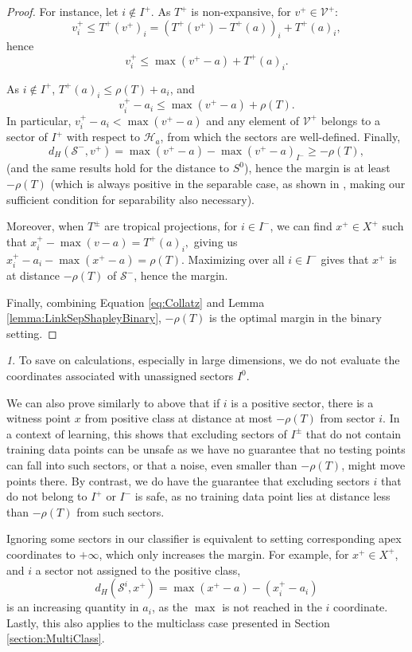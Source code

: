 \documentclass[oneside,UKenglish,a4paper]{amsart}
\numberwithin{equation}{section}
\numberwithin{figure}{section}
\theoremstyle{plain}
\theoremstyle{definition}
\theoremstyle{plain}
\theoremstyle{remark}
\newtheorem{rem}[thm]{\protect\remarkname}
\theoremstyle{plain}
\theoremstyle{definition}
\theoremstyle{definition}
\providecommand{\remarkname}{Remark}
\begin{document}
\begin{proof}
For instance, let $i\notin I^{+}$. As $T^{+}$ is non-expansive, for $v^{+}\in \mathcal{V}^{+}$:
\[
v_{i}^{+}\le T^{+}(v^{+})_{i}=\left(T^{+}(v^{+})-T^{+}(a)\right)_{i}+T^{+}(a)_{i},
\]
hence 
\begin{equation*}
v_{i}^{+}\le\max(v^{+}-a)+T^{+}(a)_{i}.
\end{equation*}

As $i\notin I^+$, $T^{+}(a)_{i}\le \rho(T)+a_{i}$,
and
\[
v_{i}^{+}-a_{i}\le\max(v^{+}-a)+\rho(T).
\]
In particular, $v_{i}^{+}-a_{i}<\max(v^{+}-a)$ and any element of
$\mathcal{V}^{+}$ belongs to a sector of $I^+$ with
respect to $\mathcal{H}_{a}$, from which the sectors are well-defined.
Finally, 
\[
d_H(\mathcal{S}^-,v^{+})=\max(v^{+}-a)-\max(v^{+}-a)_{I^{-}}\ge-\rho(T),
\]
(and the same results hold for the distance to $S^0$), hence the margin is at least $-\rho(T)$ (which is always positive in the separable case, as shown in \cite{Allamigeon2018}, making our sufficient condition for separability also necessary).

Moreover, when $T^{\pm}$
are tropical projections, for  $i\in I^{-}$, we can
find $x^+\in X^{+}$ such that  $x^+_{i}-\max(v-a) = T^{+}(a)_{i},$ giving us 
$x^+_{i}-a_{i}-\max(x^+-a)=\rho(T).$ Maximizing over all $i\in I^{-}$ gives that $x^+$ is at distance $-\rho(T)$ of $\mathcal{S}^-$, hence the margin.

Finally, combining Equation \ref{eq:Collatz} and Lemma \ref{lemma:LinkSepShapleyBinary}, $-\rho(T)$ is the optimal margin in the binary setting.
\end{proof}

\begin{rem}\label{rem:UnreachedSectors}
To save on calculations, especially in large dimensions, we do not evaluate the coordinates associated with unassigned sectors $I^0$.

We can also prove similarly to above that if $i$ is a positive sector, there is a witness point $x$ from positive class at distance at most $-\rho(T)$ from sector $i$. In a context of learning, this shows that excluding sectors of $I^\pm$ that do not contain training data points can be unsafe as we have no guarantee that no testing points can fall into such sectors, or that a noise, even smaller than $-\rho(T)$, might move points there. By contrast, we do have the guarantee that excluding sectors $i$ that do not belong to $I^+$ or $I^-$ is safe, as no training data point lies at distance less than $-\rho(T)$ from such sectors.


Ignoring some sectors in our classifier is equivalent to setting corresponding apex coordinates to $+\infty$, which only increases the margin. For example, for $x^+\in X^+$, and $i$ a sector not assigned to the positive class, $$d_H(\mathcal{S}^i, x^+)=\max(x^+-a) - (x^+_i - a_i)$$ is an increasing quantity in $a_i$, as the $\max$ is not reached in the $i$ coordinate. 
Lastly, this also applies to the multiclass case presented in Section \ref{section:MultiClass}.
\end{rem}
\end{document}
